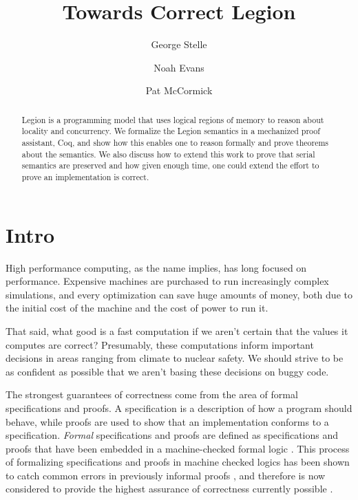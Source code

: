 \documentclass[sigconf]{acmart}
\begin{document}
\title{Towards Correct Legion}
\author{George Stelle}

\author{Noah Evans}

\author{Pat McCormick}

\begin{abstract}
Legion is a programming model that uses logical regions of memory to reason about 
locality and concurrency. We formalize the Legion semantics in a mechanized
proof assistant, Coq, and show how this enables one to reason formally and
prove theorems about the semantics. We also discuss how to extend this work to
prove that serial semantics are preserved and how given enough time, one could
extend the effort to prove an implementation is correct.
\end{abstract}

\maketitle

\section{Intro}
High performance computing, as the name implies, has long focused on
performance. Expensive machines are purchased to run increasingly complex
simulations, and every optimization can save huge amounts of money, both due to
the initial cost of the machine and the cost of power to run it. 

That said, what good is a fast computation if we aren't certain that the
values it computes are correct? Presumably, these computations inform important
decisions in areas ranging from climate to nuclear safety. We should strive to
be as confident as possible that we aren't basing these decisions on buggy
code.

The strongest guarantees of correctness come from the area of formal
specifications and proofs. A specification is a description of how a program
should behave, while proofs are used to show that an implementation conforms to
a specification. \emph{Formal} specifications and proofs are defined as
specifications and proofs that have been embedded in a machine-checked formal
logic \cite{bertot2013interactive, nipkow2002isabelle, pfenning1999system, jackson1994nuprl}. This process of formalizing specifications and
proofs in machine checked logics has been shown to catch common errors in
previously informal proofs \cite{clarke1996formal}, and therefore is now considered
to provide the highest assurance of correctness currently possible \cite{?}.
\end{document}
